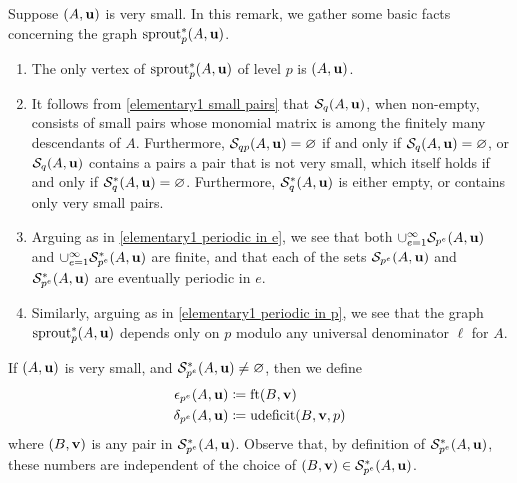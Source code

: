\documentclass[11pt]{amsart}
\newcommand{\udeficit}{\operatorname{udeficit}}
\renewcommand{\S}{\mathcal{S}}
\begin{document}
\begin{remark}
\label{elementary2: R}
Suppose $(A,\mathbf{u})$ is very small.  In this remark, we gather some basic facts  concerning the graph $\operatorname{sprout}^{\ast}_p(A,\mathbf{u})$.
\begin{enumerate}


\item  \label{elementary2 lowest level}  The only vertex of $\operatorname{sprout}_p^{\ast}(A,\mathbf{u})$ of level $p$ is $(A,\mathbf{u})$.
\item \label{elementary2 small pairs}  It follows from \eqref{elementary1 small pairs} that $\S_{q}(A,\vv{u})$, when non-empty, consists of small pairs whose monomial matrix is among the finitely many descendants of $A$.  Furthermore, $\S_{qp}(A,\vv{u}) = \emptyset$ if and only if $\S_q(A,\vv{u}) = \emptyset$, or $\S_q(A,\vv{u})$ contains a pairs a pair that is not very small, which itself holds if and only if $\S_{q}^{\ast}(A,\vv{u})= \emptyset$.   Furthermore, $\S_q^{\ast}(A,\vv{u})$ is either empty, or contains only very small pairs.

\item \label{elementary2 periodic in e} Arguing as in \eqref{elementary1 periodic in e}, we see that both $\cup_{e=1}^{\infty} \S_{p^e}(A,\vv{u})$ and  $\cup_{e=1}^{\infty} \S^{\ast}_{p^e}(A,\vv{u})$ are finite, and that each of the sets $\S_{p^e}(A,\vv{u})$ and $\S^{\ast}_{p^e}(A,\vv{u})$ are eventually periodic in $e$.

\item \label{elementary2 periodic in p} Similarly, arguing as in \eqref{elementary1 periodic in p}, we see that the graph $\operatorname{sprout}_p^{\ast}(A,\mathbf{u})$ depends only on $p$ modulo any universal denominator $\ell$ for $A$.
\end{enumerate}
\end{remark}



\begin{definition}
\label{epsilon delta: D}
  If $(A,\mathbf{u})$ is very small, and $\S^{\ast}_{p^e}(A,\vv{u}) \neq \emptyset$, then we define 
 \begin{align*}
 \epsilon_{p^e}(A,\vv{u}) & \coloneqq \ft{B}{\vv{v}} \\ 
  \delta_{p^e}(A,\vv{u}) & \coloneqq \udeficit(B,\vv{v},p)
 \end{align*}
 where $(B,\mathbf{v})$ is any pair in $\S^{\ast}_{p^e}(A,\vv{u})$.  Observe that, by definition of $\S^{\ast}_{p^e}(A,\vv{u})$, these numbers are independent of the choice of $(B,\vv{v}) \in \S^{\ast}_{p^e}(A,\vv{u})$.

\end{definition}
\end{document}
